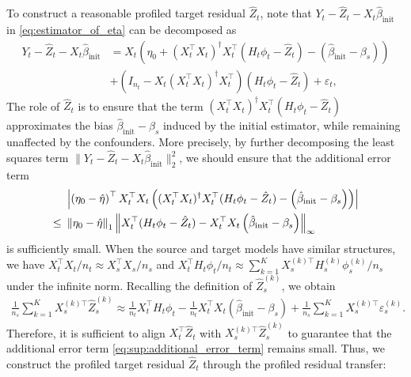\documentclass[12pt]{article}
\begin{document}
To construct a reasonable profiled target residual $\hat{Z}_t$, note that $Y_t -\hat{Z}_t - X_t\hat{\beta}_{\text{init}}$ in \eqref{eq:estimator_of_eta} can be decomposed as
\begin{align*}
    Y_t - \hat{Z}_t - X_t\hat{\beta}_{\text{init}}&= X_t\left(\eta_0 +(X_t^\top X_t)^{\dagger} X_t^\top (H_t\phi_t - \hat{Z}_t) - (\hat{\beta}_{\text{init}} - \beta_s)\right) \\&+ \left(I_{n_t} - X_t(X_t^\top X_t)^{\dagger} X_t^\top\right) \left(H_t\phi_t -\hat{Z}_t\right) + \varepsilon_t,
\end{align*}
The role of $\hat{Z}_t$ is to ensure that the term $(X_t^\top X_t)^{\dagger} X_t^\top (H_t\phi_t - \hat{Z}_t)$ approximates the bias $\hat{\beta}_{\text{init}}-\beta_s$ induced by the initial estimator, while remaining unaffected by the confounders. More precisely, by further decomposing the least squares term $\|Y_t - \hat{Z}_t - X_t\hat{\beta}_{\text{init}}\|_2^2$, we should ensure that the additional error term
\begin{align}
\label{eq:sup:additional_error_term}
    & \left|\left(\eta_0 - \hat{\eta}\right)^\top X_t^\top X_t \left((X_t^\top X_t)^{\dagger} X_t^\top (H_t\phi_t - \hat{Z}_t) - \left(\hat{\beta}_{\text{init}} - \beta_s \right)\right)\right|\notag\\ \le\ &
    \left\|\eta_0 - \hat{\eta}\right\|_1 \left\| X_t^\top (H_t\phi_t - \hat{Z}_t) -X_t^\top X_t \left(\hat{\beta}_{\text{init}} - \beta_s \right)\right\|_{\infty}
\end{align}
is sufficiently small. When the source and target models have similar structures, we have $X_t^\top X_t/n_t \approx X_s^\top X_s/n_s$ and $X_t^\top H_t\phi_t/n_t \approx \sum_{k=1}^K X_s^{(k)\top}H_s^{(k)}\phi_s^{(k)}/n_s$ under the infinite norm. Recalling the definition of $\hat{Z}_s^{(k)}$, we obtain
\begin{align*}
    \frac{1}{n_s}\sum_{k=1}^K X_s^{(k)\top}\hat{Z}_s^{(k)} \approx  \frac{1}{n_t} X_t^\top H_t\phi_t - \frac{1}{n_t}X_t^\top X_t\left( \hat{\beta}_{\text{init}}-\beta_s \right) +  \frac{1}{n_s}\sum_{k=1}^K X_s^{(k)\top}\varepsilon_s^{(k)}.
\end{align*}
Therefore, it is sufficient to align $X_t^\top \hat{Z}_t$ with $X_s^{(k)\top}\hat{Z}_s^{(k)}$ to guarantee that the additional error term \eqref{eq:sup:additional_error_term} remains small. Thus, we construct the profiled target residual $\hat{Z}_t$ through the profiled residual transfer:
\end{document}
